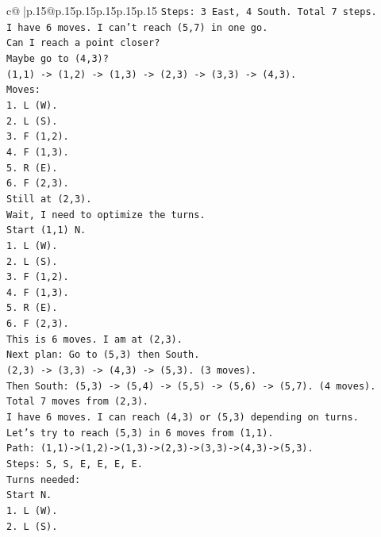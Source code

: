 \documentclass{article}
\begin{document}
{\begin{supertabular}{c@{$\;$}|p{.15\linewidth}@{}p{.15\linewidth}p{.15\linewidth}p{.15\linewidth}p{.15\linewidth}p{.15\linewidth}}
{{{\texttt{Steps: 3 East, 4 South. Total 7 steps.} \\
\texttt{I have 6 moves. I can't reach (5,7) in one go.} \\
\texttt{Can I reach a point closer?} \\
\texttt{Maybe go to (4,3)?} \\
\texttt{(1,1) {-}> (1,2) {-}> (1,3) {-}> (2,3) {-}> (3,3) {-}> (4,3).} \\
\texttt{Moves:} \\
\texttt{1. L (W).} \\
\texttt{2. L (S).} \\
\texttt{3. F (1,2).} \\
\texttt{4. F (1,3).} \\
\texttt{5. R (E).} \\
\texttt{6. F (2,3).} \\
\texttt{Still at (2,3).} \\
\texttt{Wait, I need to optimize the turns.} \\
\texttt{Start (1,1) N.} \\
\texttt{1. L (W).} \\
\texttt{2. L (S).} \\
\texttt{3. F (1,2).} \\
\texttt{4. F (1,3).} \\
\texttt{5. R (E).} \\
\texttt{6. F (2,3).} \\
\texttt{This is 6 moves. I am at (2,3).} \\
\texttt{Next plan: Go to (5,3) then South.} \\
\texttt{(2,3) {-}> (3,3) {-}> (4,3) {-}> (5,3). (3 moves).} \\
\texttt{Then South: (5,3) {-}> (5,4) {-}> (5,5) {-}> (5,6) {-}> (5,7). (4 moves).} \\
\texttt{Total 7 moves from (2,3).} \\
\texttt{I have 6 moves. I can reach (4,3) or (5,3) depending on turns.} \\
\texttt{Let's try to reach (5,3) in 6 moves from (1,1).} \\
\texttt{Path: (1,1){-}>(1,2){-}>(1,3){-}>(2,3){-}>(3,3){-}>(4,3){-}>(5,3).} \\
\texttt{Steps: S, S, E, E, E, E.} \\
\texttt{Turns needed:} \\
\texttt{Start N.} \\
\texttt{1. L (W).} \\
\texttt{2. L (S).} \\
}}}
\end{supertabular}}
\end{document}
